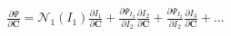 \documentclass[preview]{standalone}
\begin{document}
\begin{align*}
\frac{\partial \Psi}{\partial \mathbf{C}}  =  \mathcal{N}_1(I_1) \frac{\partial I_1}{\partial \mathbf{C}}  +  \frac{\partial \Psi_{I_2}}{\partial I_2} \frac{\partial I_2}{\partial \mathbf{C}}  +  \frac{\partial \Psi_{I_2}}{\partial I_2} \frac{\partial I_3}{\partial \mathbf{C}}  + ...
\end{align*}
\end{document}
